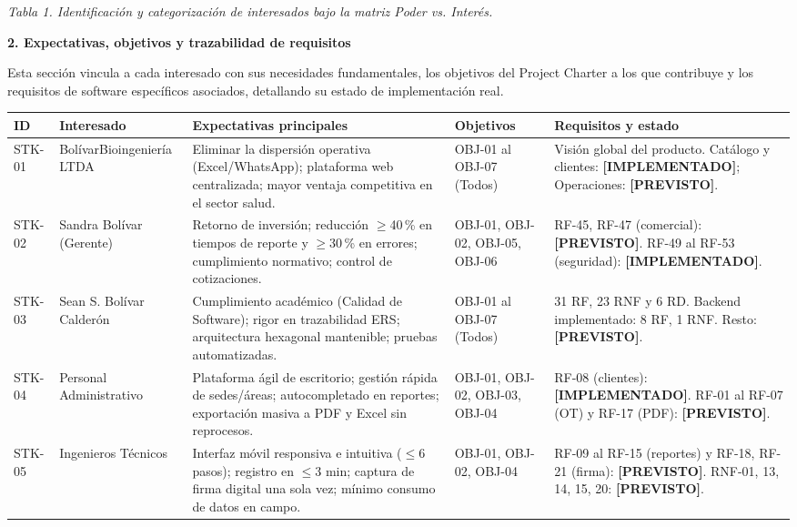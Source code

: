 \documentclass[12pt,varwidth=170mm,border=10pt]{standalone}
\newcommand{\sectiontitle}[1]{%
  \par\vspace{1.8ex}%
  {\normalfont\Large\bfseries #1\par}%
  \vspace{1.0ex}%
}
\newcommand{\estadoImplementado}{\textcolor{mainRed}{\textbf{[IMPLEMENTADO]}}}
\newcommand{\estadoPrevisto}{\textcolor{mainGray}{\textbf{[PREVISTO]}}}
\newcommand{\tablecaption}[2]{%
  \par\vspace{0.4em}%
  \begin{center}
    \footnotesize\textit{Tabla #1. #2}
  \end{center}
  \vspace{1.0em}%
}
\begin{document}
\tablecaption{1}{Identificación y categorización de interesados bajo la matriz Poder vs. Interés.}
\endgroup

\sectiontitle{2. Expectativas, objetivos y trazabilidad de requisitos}

Esta sección vincula a cada interesado con sus necesidades fundamentales, los objetivos del Project Charter a los que contribuye y los requisitos de software específicos asociados, detallando su estado de implementación real.

\begingroup
\small
\begin{center}
\begin{tabular}{|C{1.2cm}|L{2.8cm}|L{4.9cm}|L{2.0cm}|L{3.3cm}|}
\hline
\textbf{ID} & \textbf{Interesado} & \textbf{Expectativas principales} & \textbf{Objetivos} & \textbf{Requisitos y estado} \\
\hline
STK-01 & Bolívar\-Bioingeniería LTDA & Eliminar la dispersión operativa (Excel/WhatsApp); plataforma web centralizada; mayor ventaja competitiva en el sector salud. & OBJ-01 al OBJ-07 (Todos) & Visión global del producto. Catálogo y clientes: \estadoImplementado{}; Operaciones: \estadoPrevisto{}. \\
\hline
STK-02 & Sandra Bolívar (Gerente) & Retorno de inversión; reducción $\geq$40\,\% en tiempos de reporte y $\geq$30\,\% en errores; cumplimiento normativo; control de cotizaciones. & OBJ-01, OBJ-02, OBJ-05, OBJ-06 & RF-45, RF-47 (comercial): \estadoPrevisto{}. \newline RF-49 al RF-53 (seguridad): \estadoImplementado{}. \\
\hline
STK-03 & Sean S. Bolívar Calderón & Cumplimiento académico (Calidad de Software); rigor en trazabilidad ERS; arquitectura hexagonal mantenible; pruebas automatizadas. & OBJ-01 al OBJ-07 (Todos) & 31 RF, 23 RNF y 6 RD. Backend implementado: 8 RF, 1 RNF. Resto: \estadoPrevisto{}. \\
\hline
STK-04 & Personal Administrativo & Plataforma ágil de escritorio; gestión rápida de sedes/áreas; autocompletado en reportes; exportación masiva a PDF y Excel sin reprocesos. & OBJ-01, OBJ-02, OBJ-03, OBJ-04 & RF-08 (clientes): \estadoImplementado{}. \newline RF-01 al RF-07 (OT) y RF-17 (PDF): \estadoPrevisto{}. \\
\hline
STK-05 & Ingenieros Técnicos & Interfaz móvil responsiva e intuitiva ($\leq$6 pasos); registro en $\leq$3 min; captura de firma digital una sola vez; mínimo consumo de datos en campo. & OBJ-01, OBJ-02, OBJ-04 & RF-09 al RF-15 (reportes) y RF-18, RF-21 (firma): \estadoPrevisto{}. \newline RNF-01, 13, 14, 15, 20: \estadoPrevisto{}. \\

\end{tabular}
\end{center}
\end{document}
